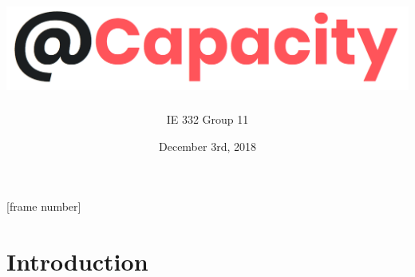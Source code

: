 \documentclass{beamer}
\title[@Capacity]{\includegraphics[width=.85\textwidth]{capacity_logo.png}} %
\author{IE 332 Group 11} %
\institute[IE 332 Group 11] %
{
Purdue University \\ %
}
\date{December 3rd, 2018} %
\begin{document}
[frame number]


\begin{frame}
\titlepage %
\end{frame}


\section{Introduction} 
\end{document}
